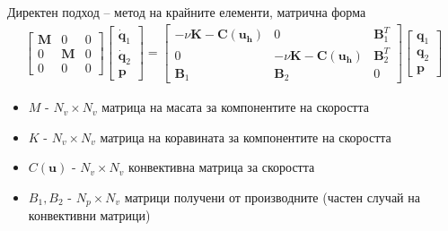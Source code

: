 \documentclass{beamer}
\begin{document}
    \begin{frame}{Директен подход -- метод на крайните елементи, матрична форма}
		\begin{multline*}
  \begin{bmatrix}
  \mathbf{M} & 0 & 0 \\
  0 & \mathbf{M} & 0 \\
  0 & 0 & 0
  \end{bmatrix}
  \begin{bmatrix}
  \dot{\mathbf{q}}_1\\
  \dot{\mathbf{q}}_2\\
  \mathbf{p}
  \end{bmatrix}
  =
  \begin{bmatrix}
  -\nu\mathbf{K} - \mathbf{C(u_h)} & 0 & \mathbf{B}^T_1 \\
  0 & -\nu\mathbf{K} - \mathbf{C(u_h)} & \mathbf{B}^T_2 \\
  \mathbf{B}_1 & \mathbf{B}_2 & 0
  \end{bmatrix}
  \begin{bmatrix}
  \mathbf{q}_1\\
  \mathbf{q}_2\\
  \mathbf{p}
  \end{bmatrix}
\end{multline*}
	\begin{itemize}[<+->]
		\item $M$ - $N_v \times N_v$ матрица на масата за компонентите на скоростта
		\item $K$ - $N_v \times N_v$ матрица на коравината за компонентите на скоростта
		\item $C(\mathbf{u})$ - $N_v \times N_v$ конвективна матрица за скоростта
		\item $B_1, B_2$ - $N_p \times N_v$ матрици получени от производните (частен случай на конвективни матрици)
	\end{itemize}
    \end{frame}

\iftrue   
   
\end{document}
